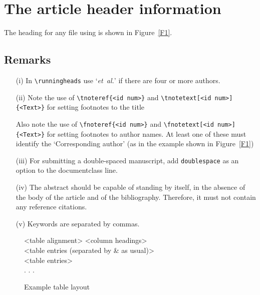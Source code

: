 \documentclass[fonts]{icst}
\begin{document}
\section{The article header information}
The heading for any file using \textsf{\journalclass} is shown in
Figure~\ref{F1}.

\subsection{Remarks}
\begin{enumerate}
\item[(i)] In \verb"\runningheads" use `\emph{et~al.}' if there
are four or more authors.

\item[(ii)] Note the use of \verb"\tnoteref{<id num>}" and \verb "\tnotetext[<id num>]{<Text>}" for setting footnotes to the title

Also note the use of \verb"\fnoteref{<id num>}" and
\verb"\fnotetext[<id num>]{<Text>}" for setting footnotes to author names. At
least one of these must identify the `Corresponding author' (as in the example shown in Figure~\ref{F1})

\item[(iii)] For submitting a double-spaced manuscript, add
\verb"doublespace" as an option to the documentclass line.

\item[(iv)] The abstract should be capable of standing by itself,
in the absence of the body of the article and of the bibliography.
Therefore, it must not contain any reference citations.

\item[(v)] Keywords are separated by commas.
\end{enumerate}

\begin{figure}
\setlength{\fboxsep}{0pt}%
\setlength{\fboxrule}{0pt}%
\begin{center}
\begin{boxedverbatim}
\begin{table}\small\sf
\caption{<Table caption>}
\centering
\begin{tabular}{<table alignment>}
\toprule
<column headings>\\
\midrule
<table entries
(separated by & as usual)>\\
<table entries>\\
.
.
.\\
\bottomrule
\end{tabular}
\end{table}
\end{boxedverbatim}
\end{center}
\caption{Example table layout\label{F2}}
\end{figure}
\end{document}
